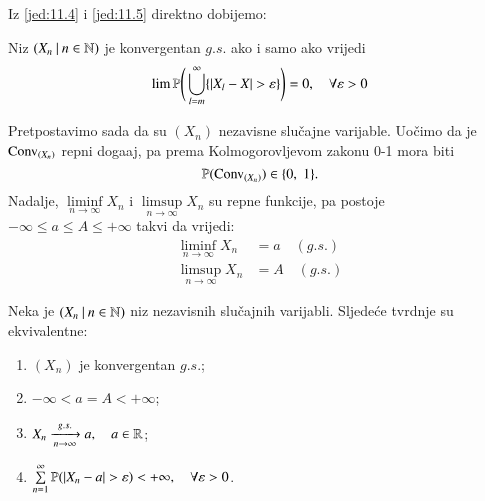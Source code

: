 Iz \eqref{jed:11.4} i \eqref{jed:11.5} direktno dobijemo:

\begin{lm}  \label{lm:11.6}
    Niz $({X_n} \: | \: {n \in \mathbb{N}})$ je konvergentan $g.s.$ ako i samo ako vrijedi
    \begin{equation*}
        \lim\limits \mathbb{P} \Bigg( \bigcup\limits_{l = m}^{\infty} \{ |X_l - X| > \varepsilon \} \Bigg) = 0, \quad \forall \varepsilon > 0
    \end{equation*}
\end{lm}

Pretpostavimo sada da su $(X_n)$ nezavisne slu\v cajne varijable.
Uo\v cimo da je $\mathrm{Conv}_{(X_n)}$ repni doga\dj aj, pa prema Kolmogorovljevom zakonu 0-1 mora biti
\begin{equation}    \label{jed:11.7}
    \mathbb{P}({\mathrm{Conv}_{(X_n)}}) \in \{ 0, \; 1 \}.
\end{equation}
Nadalje, $\liminf\limits_{n \to \infty} X_n$ i $\limsup\limits_{n \to \infty} X_n$ su repne funkcije, pa postoje $- \infty \leq a \leq A \leq +\infty$ takvi da vrijedi:
\begin{equation}    \label{jed:11.8}
    \begin{aligned}
        \liminf\limits_{n \to \infty} X_n &= a \quad (g.s.)\\
        \limsup\limits_{n \to \infty} X_n &= A \quad (g.s.)
    \end{aligned}
\end{equation}

\begin{tm}  \label{tm:11.9}
    Neka je $({X_n} \: | \: {n \in \mathbb{N}})$ niz nezavisnih slu\v cajnih varijabli.
    Sljede\' ce tvrdnje su ekvivalentne:
    \begin{enumerate}[label=(\roman*)]
        \item   \label{tm:11.9.1}
        $(X_n)$ je konvergentan $g.s.$;
        \item   \label{tm:11.9.2}
        $-\infty < a = A < +\infty$;
        \item   \label{tm:11.9.3}
        $X_n \xrightarrow[n \to \infty]{g.s.} a, \quad a \in \mathbb{R}$;
        \item   \label{tm:11.9.4}
        $\sum\limits_{n = 1}^{\infty} \mathbb{P}({|X_n - a| > \varepsilon}) < +\infty, \quad \forall \varepsilon > 0$.
    \end{enumerate}
\end{tm}

